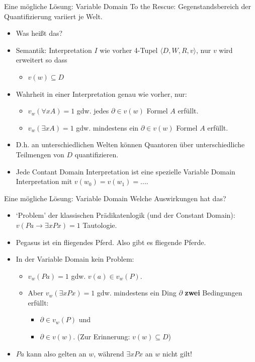 \documentclass[12pt]{beamer}
\begin{document}
\begin{frame}{Eine mögliche Lösung: Variable Domain}
  To the Rescue: Gegenstandsbereich der Quantifizierung variiert je
  Welt.
  \begin{itemize}[<+->]
  \item Was heißt das?
  \item Semantik: Interpretation $I$ wie vorher 4-Tupel
    $\langle D, W, R, v \rangle$, nur $v$ wird erweitert so dass
    \begin{itemize}[<+->]
    \item $v(w) \subseteq D$
    \end{itemize}
  \item Wahrheit in einer Interpretation genau wie vorher, nur:
    \begin{itemize}[<+->]
    \item $v_w(\forall x A) = 1$ gdw. jedes $\partial \in v(w)$ Formel
      $A$ erfüllt.
    \item $v_w(\exists x A) = 1$ gdw. mindestens ein
      $\partial \in v(w)$ Formel $A$ erfüllt.
    \end{itemize}
  \item D.h. an unterschiedlichen Welten können Quantoren über
    unterschiedliche Teilmengen von $D$ quantifizieren.
  \item Jede Contant Domain Interpretation ist eine spezielle Variable
    Domain Interpretation mit $v(w_0) = v(w_1) = ...$.
  \end{itemize}

\end{frame}

\begin{frame}{Eine mögliche Lösung: Variable Domain}
  Welche Auswirkungen hat das?
  \begin{itemize}[<+->]
  \item `Problem' der klassischen Prädikatenlogik (und der Constant
    Domain): $v(Pa \to \exists x Px) = 1$ Tautologie.
  \item Pegasus ist ein fliegendes Pferd. Also gibt es fliegende
    Pferde.
  \item In der Variable Domain kein Problem:
    \begin{itemize}[<+->]
    \item $v_w(Pa) = 1$ gdw. $v(a) \in v_w(P)$.
    \item Aber $v_w(\exists x Px) = 1$ gdw. mindestens ein Ding
      $\partial$ \textbf{zwei} Bedingungen erfüllt:
      \begin{itemize}
      \item $\partial \in v_w(P)$ und
      \item $\partial \in v(w)$. (Zur Erinnerung: $v(w) \subseteq D$)
      \end{itemize}
    \end{itemize}
  \item $Pa$ kann also gelten an $w$, während $\exists x Px$ an $w$
    nicht gilt!
  \end{itemize}
\end{frame}
\end{document}
